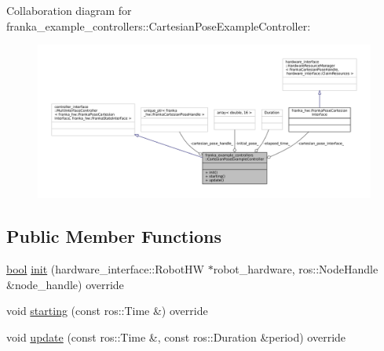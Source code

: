 Collaboration diagram for franka\+\_\+example\+\_\+controllers\+:\+:Cartesian\+Pose\+Example\+Controller\+:
\nopagebreak
\begin{figure}[H]
\begin{center}
\leavevmode
\includegraphics[width=350pt]{classfranka__example__controllers_1_1CartesianPoseExampleController__coll__graph}
\end{center}
\end{figure}
\subsection*{Public Member Functions}
\begin{DoxyCompactItemize}
\item 
\hyperlink{classbool}{bool} \hyperlink{classfranka__example__controllers_1_1CartesianPoseExampleController_a461de40a8f5d8a76b80b25fc581e0376}{init} (hardware\+\_\+interface\+::\+Robot\+HW $\ast$robot\+\_\+hardware, ros\+::\+Node\+Handle \&node\+\_\+handle) override
\item 
void \hyperlink{classfranka__example__controllers_1_1CartesianPoseExampleController_a80a14c57df1285078330b8d70bd7308b}{starting} (const ros\+::\+Time \&) override
\item 
void \hyperlink{classfranka__example__controllers_1_1CartesianPoseExampleController_aaecae953c1aeeaa8d08b569f0ef4723d}{update} (const ros\+::\+Time \&, const ros\+::\+Duration \&period) override
\end{DoxyCompactItemize}
